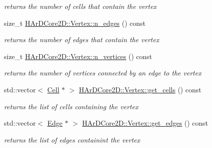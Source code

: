 \begin{DoxyCompactItemize}
\begin{DoxyCompactList}\small\item\em returns the number of cells that contain the vertex \end{DoxyCompactList}\item 
\mbox{\label{group__Mesh_ga1d6d5233c4f95c862387b5961fef5a22}} 
size\+\_\+t \hyperlink{group__Mesh_ga1d6d5233c4f95c862387b5961fef5a22}{H\+Ar\+D\+Core2\+D\+::\+Vertex\+::n\+\_\+edges} () const
\begin{DoxyCompactList}\small\item\em returns the number of edges that contain the vertex \end{DoxyCompactList}\item 
\mbox{\label{group__Mesh_ga64033a69394a8fa757ca097407ab5e0a}} 
size\+\_\+t \hyperlink{group__Mesh_ga64033a69394a8fa757ca097407ab5e0a}{H\+Ar\+D\+Core2\+D\+::\+Vertex\+::n\+\_\+vertices} () const
\begin{DoxyCompactList}\small\item\em returns the number of vertices connected by an edge to the vertex \end{DoxyCompactList}\item 
\mbox{\label{group__Mesh_gaff000e01e8c4bd44162ae8b526950d31}} 
std\+::vector$<$ \hyperlink{classHArDCore2D_1_1Cell}{Cell} $\ast$ $>$ \hyperlink{group__Mesh_gaff000e01e8c4bd44162ae8b526950d31}{H\+Ar\+D\+Core2\+D\+::\+Vertex\+::get\+\_\+cells} () const
\begin{DoxyCompactList}\small\item\em returns the list of cells containing the vertex \end{DoxyCompactList}\item 
\mbox{\label{group__Mesh_ga4a43457a0b69df1db3f3892824c272bb}} 
std\+::vector$<$ \hyperlink{classHArDCore2D_1_1Edge}{Edge} $\ast$ $>$ \hyperlink{group__Mesh_ga4a43457a0b69df1db3f3892824c272bb}{H\+Ar\+D\+Core2\+D\+::\+Vertex\+::get\+\_\+edges} () const
\begin{DoxyCompactList}\small\item\em returns the list of edges containint the vertex \end{DoxyCompactList}\item 
\mbox{\label{group__Mesh_ga67a622b04ce68250a53bc0825487bb6e}} 

\end{DoxyCompactItemize}

